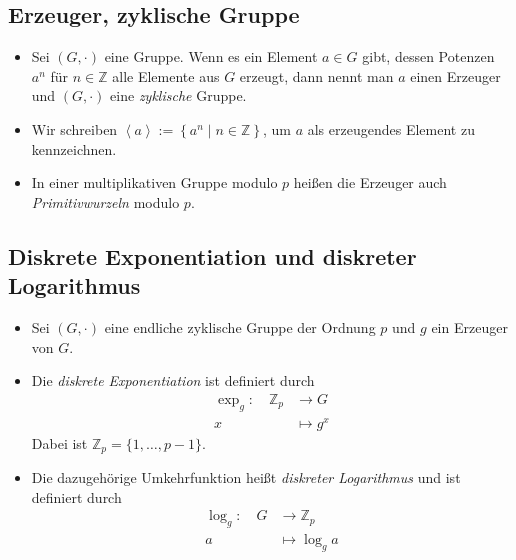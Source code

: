 \documentclass[utf8]{beamer}
\newcommand{\Z}{\mathbb{Z}}
\begin{document}
\subsection{Erzeuger, zyklische Gruppe}
\label{sub:erzeuger_zyklische_gruppe}

\begin{frame}{\insertsubsectionhead}
  \begin{itemize}
    \item Sei $(G, \cdot)$ eine Gruppe. Wenn es ein Element $a \in G$ gibt,
      dessen Potenzen $a^n$ für $n \in \Z$ alle Elemente aus $G$ erzeugt, dann
      nennt man $a$ einen Erzeuger und $(G, \cdot)$ eine \emph{zyklische}
      Gruppe.

    \item Wir schreiben $\left\langle a \right\rangle := \left\{ a^n \mid n \in
      \Z \right\}$, um $a$ als erzeugendes Element zu kennzeichnen.

    \item In einer multiplikativen Gruppe modulo $p$ heißen die Erzeuger auch
      \emph{Primitivwurzeln} modulo $p$.
  \end{itemize}
\end{frame}

\subsection{Diskrete Exponentiation und diskreter Logarithmus}
\label{sub:diskrete_exponentiation}

\begin{frame}{\insertsubsectionhead}
  \begin{itemize}
    \item Sei $(G, \cdot)$ eine endliche zyklische Gruppe der Ordnung $p$ und
      $g$ ein Erzeuger von $G$.
    \item Die \emph{diskrete Exponentiation} ist definiert durch
      \begin{align*}
        \exp_g: \quad \Z_p & \to G\\
        x & \mapsto g^x
      \end{align*}
      Dabei ist $\Z_p = \{1, \dots, p-1\}$.
    \item Die dazugehörige Umkehrfunktion heißt \emph{diskreter Logarithmus} und
      ist definiert durch
      \begin{align*}
        \log_g: \quad G & \to \Z_p\\
        a & \mapsto \log_g a
      \end{align*}
  \end{itemize}
\end{frame}
\end{document}
